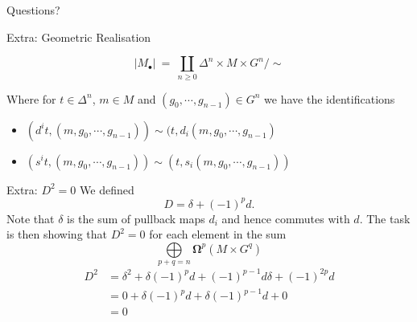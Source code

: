 \documentclass{beamer}
\newcommand{\omg}[1]{\boldsymbol{\Omega}^{#1}}
\begin{document}
\begin{frame}{Questions?}

\end{frame}



\begin{frame}{Extra: Geometric Realisation}

\[
|M_{\bullet}| ~ = ~ \coprod\limits_{n\geq0} \Delta^{n} \times M \times G^{n} / \sim
\]
\begin{center}
\end{center}
Where for $t \in \Delta^n$, $m \in M$ and $(g_0,\cdots,g_{n-1})\in G^{n}$ we have the identifications
\begin{itemize}
\item $(d^{i}t, (m, g_0,\cdots,g_{n-1})) \sim (t, d_i(m, g_0,\cdots,g_{n-1})$
\item $(s^{i}t, (m, g_0,\cdots,g_{n-1})) \sim (t, s_i(m, g_0,\cdots,g_{n-1}))$
\end{itemize}

\end{frame}

\begin{frame}{Extra: $D^2 = 0$}
We defined
\[
D = \delta + (-1)^p d.
\]
Note that $\delta$ is the sum of pullback maps $d_i$ and hence commutes with $d$. The task is then showing that $D^2=0$ for each element in the sum
\[
\bigoplus\limits_{p+q=n}\omg{p}(M\times G^q)
\]
\begin{align*}
D^2 &= \delta^2 + \delta(-1)^{p}d + (-1)^{p-1}d\delta + (-1)^{2p}d\\
&= 0 + \delta(-1)^{p}d + \delta(-1)^{p-1}d + 0\\
&= 0
\end{align*}

\end{frame}
\end{document}
